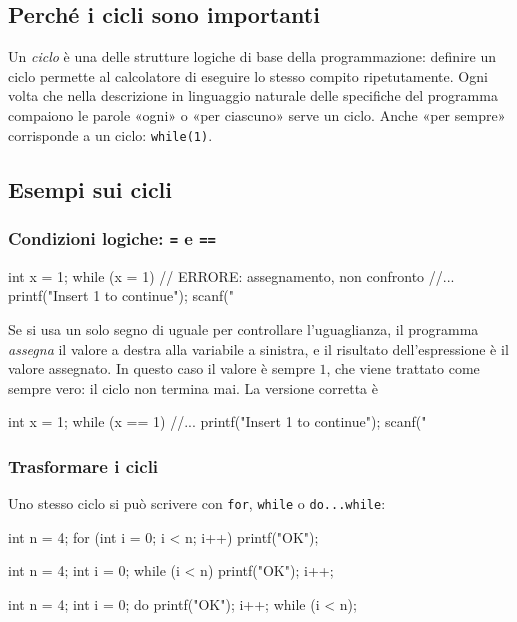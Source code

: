 \documentclass[11pt,a4paper]{article}
\begin{document}
\subsection{Perché i cicli sono importanti}

Un \emph{ciclo} è una delle strutture logiche di base della programmazione: definire un ciclo permette al calcolatore di eseguire lo stesso compito ripetutamente. Ogni volta che nella descrizione in linguaggio naturale delle specifiche del programma compaiono le parole «ogni» o «per ciascuno» serve un ciclo. Anche «per sempre» corrisponde a un ciclo: \lstinline|while(1)|.

\subsection{Esempi sui cicli}

\subsubsection{Condizioni logiche: \texttt{=} e \texttt{==}}

\begin{codice}
int x = 1;
while (x = 1) {          // ERRORE: assegnamento, non confronto
    //...
    printf("Insert 1 to continue");
    scanf("%
}
\end{codice}
Se si usa un solo segno di uguale per controllare l'uguaglianza, il programma \emph{assegna} il valore a destra alla variabile a sinistra, e il risultato dell'espressione è il valore assegnato. In questo caso il valore è sempre $1$, che viene trattato come sempre vero: il ciclo non termina mai. La versione corretta è
\begin{codice}
int x = 1;
while (x == 1) {
    //...
    printf("Insert 1 to continue");
    scanf("%
}
\end{codice}

\subsubsection{Trasformare i cicli}

Uno stesso ciclo si può scrivere con \lstinline|for|, \lstinline|while| o \lstinline|do...while|:
\begin{codice}
int n = 4;
for (int i = 0; i < n; i++) {
    printf("OK\n");
}
\end{codice}
\begin{codice}
int n = 4;
int i = 0;
while (i < n) {
    printf("OK\n");
    i++;
}
\end{codice}
\begin{codice}
int n = 4;
int i = 0;
do {
    printf("OK\n");
    i++;
} while (i < n);
\end{codice}
\end{document}
